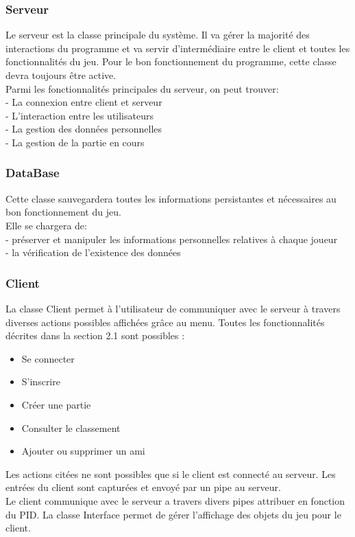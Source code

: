 \documentclass[a4paper,12pt]{article}
\begin{document}
\subsubsection{Serveur}
Le serveur est la classe principale du système. Il va gérer la majorité des interactions du programme et va servir d'intermédiaire entre le client et toutes les fonctionnalités du jeu. Pour le bon fonctionnement du programme, cette classe devra toujours être active.\\
Parmi les fonctionnalités principales du serveur, on peut trouver:\\
- La connexion entre client et serveur\\
- L'interaction entre les utilisateurs\\
- La gestion des données personnelles\\
- La gestion de la partie en cours 
\subsubsection{DataBase}
Cette classe sauvegardera toutes les informations persistantes et nécessaires au bon fonctionnement du jeu.\\
Elle se chargera de:\\
- préserver et manipuler les informations personnelles relatives à chaque joueur\\
- la vérification de l'existence des données

\subsubsection{Client}
La classe Client permet à l'utilisateur de communiquer avec le serveur à travers diverses actions possibles affichées grâce au menu.
Toutes les fonctionnalités décrites dans la section 2.1 sont possibles :
\begin{itemize}
    \item Se connecter
    \item S'inscrire
    \item Créer une partie
    \item Consulter le classement
    \item Ajouter ou supprimer un ami
\end{itemize}

Les actions citées ne sont possibles que si le client est connecté au serveur. Les entrées du client sont capturées et envoyé par un pipe au serveur.\\
Le client communique avec le serveur a travers divers pipes attribuer en fonction du PID.
La classe Interface permet de gérer l'affichage des objets du jeu pour le client.
\end{document}
